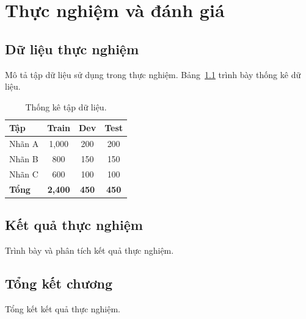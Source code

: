 \chapter{Thực nghiệm và đánh giá}
\label{Chapter4}


\section{Dữ liệu thực nghiệm}

Mô tả tập dữ liệu sử dụng trong thực nghiệm. Bảng~\ref{tab:dataset} trình bày thống kê dữ liệu.

\begin{table}[ht]
    \centering
    \caption{Thống kê tập dữ liệu.}
    \label{tab:dataset}
    \begin{tabular}{lccc}
        \toprule
        \textbf{Tập} & \textbf{Train} & \textbf{Dev} & \textbf{Test} \\
        \midrule
        Nhãn A       & 1{,}000         & 200           & 200           \\
        Nhãn B       & 800             & 150           & 150           \\
        Nhãn C       & 600             & 100           & 100           \\
        \midrule
        \textbf{Tổng} & \textbf{2{,}400} & \textbf{450} & \textbf{450} \\
        \bottomrule
    \end{tabular}
\end{table}

\section{Kết quả thực nghiệm}

Trình bày và phân tích kết quả thực nghiệm.

\section{Tổng kết chương}

Tổng kết kết quả thực nghiệm.
